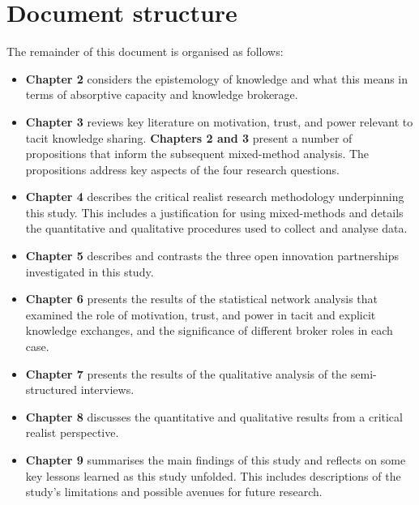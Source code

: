 \section{Document structure}

The remainder of this document is organised as follows:

\begin{itemize}[leftmargin=0pt]
    \item[] \textbf{Chapter 2} considers the epistemology of knowledge and what this means in terms of absorptive capacity and knowledge brokerage.
    \item[] \textbf{Chapter 3} reviews key literature on motivation, trust, and power relevant to tacit knowledge sharing. \textbf{Chapters 2 and 3} present a number of propositions that inform the subsequent mixed-method analysis. The propositions address key aspects of the four research questions. 
    
    \item[] \textbf{Chapter 4} describes the critical realist research methodology underpinning this study. This includes a justification for using mixed-methods and details the quantitative and qualitative procedures used to collect and analyse data.
    \item[] \textbf{Chapter 5} describes and contrasts the three open innovation partnerships investigated in this study.
    \item[] \textbf{Chapter 6} presents the results of the statistical network analysis that examined the role of motivation, trust, and power in tacit and explicit knowledge exchanges, and the significance of different broker roles in each case.
    \item[] \textbf{Chapter 7} presents the results of the qualitative analysis of the semi-structured interviews.
    \item[] \textbf{Chapter 8} discusses the quantitative and qualitative results from a critical realist perspective. 
    \item[] \textbf{Chapter 9} summarises the main findings of this study and reflects on some key lessons learned as this study unfolded. This includes descriptions of the study's limitations and possible avenues for future research. 
\end{itemize}